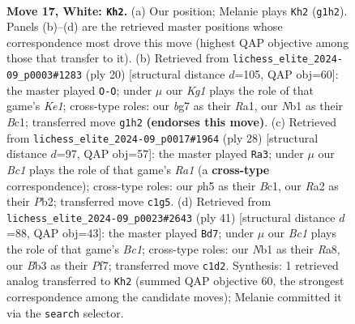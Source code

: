 \documentclass[11pt]{article}
\begin{document}
\clearpage

\begin{figure}[p]\centering
\begin{subfigure}{0.46\textwidth}\centering
\resizebox{\linewidth}{!}{%
\newchessgame
\chessboard[
  setfen={rnb1r1k1/pp2qpb1/4pnp1/1Q1p3p/P2P4/1B3NPP/RPP2P2/1NB1R1K1 w - - 2 17},
  showmover=false,
  pgfstyle=straightmove, color=movearrow, markmove={g1-h2}
]}
\caption{}
\end{subfigure}\hfill
\begin{subfigure}{0.46\textwidth}\centering
\resizebox{\linewidth}{!}{%
\newchessgame
\chessboard[
  setfen={r1bqk2r/1p2ppbp/2p2np1/p1n5/P6Q/2N2N2/BPPP2PP/R1B1K2R w KQkq - 1 11},
  showmover=false,
  pgfstyle=straightmove, color=movearrow, markmove={e1-g1}
]}
\caption{}
\end{subfigure}
\\[4pt]
\begin{subfigure}{0.46\textwidth}\centering
\resizebox{\linewidth}{!}{%
\newchessgame
\chessboard[
  setfen={1k1r3r/pppqb1pp/2np2b1/3Qp3/P1B1P3/5N1P/1PP2PP1/R1B1R1K1 w - - 1 15},
  showmover=false,
  pgfstyle=straightmove, color=movearrow, markmove={a1-a3}
]}
\caption{}
\end{subfigure}\hfill
\begin{subfigure}{0.46\textwidth}\centering
\resizebox{\linewidth}{!}{%
\newchessgame
\chessboard[
  setfen={r1b1r1k1/1pq2pbp/5np1/p7/P2BP3/1PPN1N1P/2Q1RPP1/3R2K1 b - - 2 21},
  showmover=false,
  pgfstyle=straightmove, color=movearrow, markmove={c8-d7}
]}
\caption{}
\end{subfigure}
\caption{\textbf{Move 17, White: \texttt{Kh2}.} (a) Our position; Melanie plays \texttt{Kh2} (\texttt{g1h2}). Panels (b)--(d) are the retrieved master positions whose correspondence most drove this move (highest QAP objective among those that transfer to it). (b) Retrieved from \texttt{lichess\_elite\_2024-09\_p0003\#1283} (ply 20) [structural distance $d$=105, QAP obj=60]: the master played \texttt{O-O}; under $\mu$ our \emph{Kg1} plays the role of that game's \emph{Ke1}; cross-type roles: our \emph{b}g7 as their \emph{R}a1, our \emph{N}b1 as their \emph{B}c1; transferred move \texttt{g1h2} \textbf{(endorses this move)}. (c) Retrieved from \texttt{lichess\_elite\_2024-09\_p0017\#1964} (ply 28) [structural distance $d$=97, QAP obj=57]: the master played \texttt{Ra3}; under $\mu$ our \emph{Bc1} plays the role of that game's \emph{Ra1} (a \textbf{cross-type} correspondence); cross-type roles: our \emph{p}h5 as their \emph{B}c1, our \emph{R}a2 as their \emph{P}b2; transferred move \texttt{c1g5}. (d) Retrieved from \texttt{lichess\_elite\_2024-09\_p0023\#2643} (ply 41) [structural distance $d$=88, QAP obj=43]: the master played \texttt{Bd7}; under $\mu$ our \emph{Bc1} plays the role of that game's \emph{Bc1}; cross-type roles: our \emph{N}b1 as their \emph{R}a8, our \emph{B}b3 as their \emph{P}f7; transferred move \texttt{c1d2}. Synthesis: 1 retrieved analog transferred to \texttt{Kh2} (summed QAP objective 60, the strongest correspondence among the candidate moves); Melanie committed it via the \texttt{search} selector.}
\label{fig:thought-m32}
\end{figure}
\end{document}
